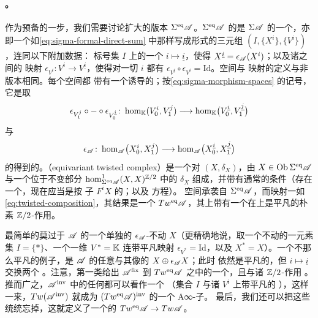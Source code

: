 \paragraph{\trEquivariant\trTwistedComplex。}\label{sub:equivariant-twisted-complexes}
作为预备的一步，我们需要讨论\trAdditive{}扩大的\trEquivariant{}版本
$\Sigma^{\mathrm{eq}}\mathscr{A}$。$\Sigma^{\mathrm{eq}}\mathscr{A}$ 的\trObject{}是
$\Sigma\mathscr{A}$ 的一个\trObject，亦即一个如\eqref{eq:sigma-formal-direct-sum}
中那样写成形式\trDirectSum{}的三元组 $(I,\{X^i\},\{V^i\})$，连同以下附加数据：
标号集 $I$ 上的一个\trInvolution{} $i\mapsto\underline{i}$，使得
$X^{\underline{i}}=\epsilon_{\mathscr{A}}(X^i)$；以及诸\trVectorSpace{}之间的%
\trGraded{}映射
$\epsilon_{V^i}\colon V^i\to V^{\underline{i}}$，使得对一切 $i$ 都有
$\epsilon_{V^{\underline{i}}}\circ\epsilon_{V^i}=\mathrm{Id}$。\trMorphism{}空间与%
\trComposition{}映射的定义与非\trEquivariant{}版本相同。每个\trMorphism{}空间都
带有一个诱导的\trInvolution；按\eqref{eq:sigma-morphism-spaces} 的记号，它是取
\begin{equation*}
\epsilon_{V_1^j}\circ-\circ\epsilon_{V_0^{\underline{i}}}\colon
\hom_{\mathbb{K}}(V_0^i,V_1^j)\longrightarrow
\hom_{\mathbb{K}}\bigl(V_0^{\underline{i}},V_1^{\underline{j}}\bigr)
\end{equation*}
与
\begin{equation*}
\epsilon_{\mathscr{A}}\colon
\hom_{\mathscr{A}}\bigl(X_0^i,X_1^j\bigr)\longrightarrow
\hom_{\mathscr{A}}\bigl(X_0^{\underline{i}},X_1^{\underline{j}}\bigr)
\end{equation*}
的\trTensorProduct{}得到的。\textbf{\trEquivariant\trTwistedComplex}（equivariant
twisted complex）是一个对 $(X,\delta_X)$，由
$X\in\operatorname{Ob}\Sigma^{\mathrm{eq}}\mathscr{A}$ 与一个位于不变部分
$\hom^1_{\Sigma^{\mathrm{eq}}\mathscr{A}}(X,X)^{\mathbb{Z}/2}$ 中的\trDifferential{}%
$\delta_X$ 组成，并带有通常的条件（存在一个\trFiltration，现在应当是按%
\trEquivariant{}子\trComplex{} $F^iX$ 的\trFiltration；以及%
\trMaurerCartan{}方程）。%
\trMorphism{}空间承袭自 $\Sigma^{\mathrm{eq}}\mathscr{A}$，而\trComposition{}映射一如
\eqref{eq:twisted-composition}，其结果是一个\trACategory{}%
$Tw^{\mathrm{eq}}\mathscr{A}$，其上带有一个在\trObject{}上是平凡的朴素 $\mathbb{Z}/2$-作用。

最简单的\trEquivariant\trTwistedComplex{}莫过于 $\mathscr{A}$ 的一个单独的
$\epsilon_{\mathscr{A}}$-不动\trObject{} $X$（更精确地说，取一个不动的一元素集
$I=\{*\}$、一个一维\trVectorSpace{} $V^*=\mathbb{K}$ 连带平凡映射
$\epsilon_{V^*}=\mathrm{Id}$，以及 $X^*=X$）。一个不那么平凡的例子，是 $\mathscr{A}$
的任意\trObject{}与其像的\trDirectSum{} $X\oplus\epsilon_{\mathscr{A}}X$；此时%
\trDifferential{}依然是平凡的，但\trInvolution{} $i\mapsto\underline{i}$ 交换两个%
\trDirectSummand。注意，第一类\trObject{}给出 $\mathscr{A}^{\mathrm{fix}}$ 到
$Tw^{\mathrm{eq}}\mathscr{A}$ 之中的一个\trFull{}\trEmbedding，且与诸 $\mathbb{Z}/2$-作用%
\trCompatible。推而广之，$\mathscr{A}^{\mathrm{inv}}$ 中的任何\trTwistedComplex{}都可以看作一个%
\trEquivariant\trTwistedComplex（集合 $I$ 与诸\trVectorSpace{} $V^i$ 上带平凡的%
\trInvolution），这样一来，$Tw(\mathscr{A}^{\mathrm{inv}})$ 就成为
$(Tw^{\mathrm{eq}}\mathscr{A})^{\mathrm{inv}}$ 的一个\trFull{} A∞-子\trCategory。
最后，我们还可以把这些\trInvolution{}统统忘掉，这就定义了一个\trFullyFaithful{}的%
\trAFunctor{} $Tw^{\mathrm{eq}}\mathscr{A}\to Tw\mathscr{A}$。

